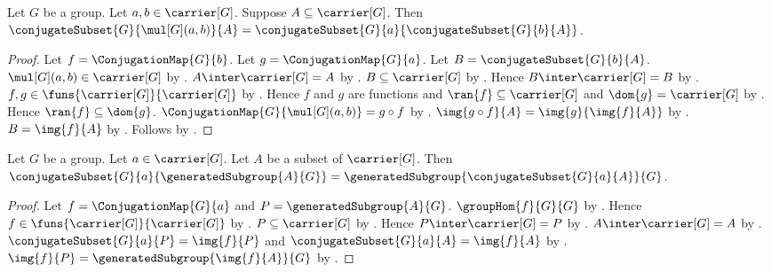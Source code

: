 \begin{theorem}\label{conjugate_subset_composition}
    Let $G$ be a group.
    Let $a,b\in\carrier[G]$.
    Suppose $A\subseteq\carrier[G]$.
    Then
        $\conjugateSubset{G}{\mul[G](a,b)}{A}=
            \conjugateSubset{G}{a}{\conjugateSubset{G}{b}{A}}$.
\end{theorem}
\begin{proof}
    Let $f=\ConjugationMap{G}{b}$.
    Let $g=\ConjugationMap{G}{a}$.
    Let $B=\conjugateSubset{G}{b}{A}$.
    $\mul[G](a,b)\in\carrier[G]$ by
        .
    $A\inter\carrier[G]=A$ by
        .
    $B\subseteq\carrier[G]$ by
        .
    Hence $B\inter\carrier[G]=B$ by
        .
    $f,g\in\funs{\carrier[G]}{\carrier[G]}$ by
        .
    Hence $f$ and $g$ are functions and
        $\ran{f}\subseteq\carrier[G]$ and
        $\dom{g}=\carrier[G]$ by
        .
    Hence $\ran{f}\subseteq\dom{g}$.
    $\ConjugationMap{G}{\mul[G](a,b)}=g\circ f$ by
        .
    $\img{g\circ f}{A}=\img{g}{\img{f}{A}}$ by
        .
    $B=\img{f}{A}$ by .
    Follows by .
\end{proof}

\begin{theorem}\label{conjugate_generated_subgroup}
    Let $G$ be a group.
    Let $a\in\carrier[G]$.
    Let $A$ be a subset of $\carrier[G]$.
    Then
        $\conjugateSubset{G}{a}{\generatedSubgroup{A}{G}}=
            \generatedSubgroup{\conjugateSubset{G}{a}{A}}{G}$.
\end{theorem}
\begin{proof}
    Let $f=\ConjugationMap{G}{a}$ and
        $P=\generatedSubgroup{A}{G}$.
    $\groupHom{f}{G}{G}$ by
        .
    Hence $f\in\funs{\carrier[G]}{\carrier[G]}$ by
        .
    $P\subseteq\carrier[G]$ by
        .
    Hence $P\inter\carrier[G]=P$ by
        .
    $A\inter\carrier[G]=A$ by
        .
    $\conjugateSubset{G}{a}{P}=\img{f}{P}$ and
        $\conjugateSubset{G}{a}{A}=\img{f}{A}$ by
        .
    $\img{f}{P}=\generatedSubgroup{\img{f}{A}}{G}$ by
        .
\end{proof}

